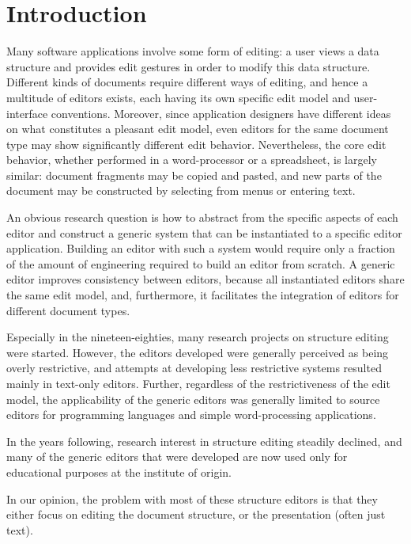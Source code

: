 \documentclass{speauth}
\begin{document}
\section{Introduction} 
\label{chap:introduction}

Many software applications involve some form of editing: a user views a data structure and provides edit gestures in order to modify this data structure. Different kinds of documents require different ways of editing, and hence a multitude of editors exists, each having its own specific edit model and user-interface conventions. Moreover,  since application designers have different ideas on what constitutes a pleasant edit model, even editors for the same document type may show significantly different edit behavior. Nevertheless, the core edit behavior, whether performed in a word-processor or a spreadsheet, is largely similar: document fragments may be copied and pasted, and new parts of the document may be constructed by selecting from menus or entering text. 

An obvious research question is how to abstract from the specific aspects of each editor and construct a generic system that can be instantiated to a specific editor application. Building an editor with such a system would require only a fraction of the amount of engineering required to build an editor from scratch. 
A generic editor improves consistency between editors, because all instantiated editors share the same edit model, and, furthermore, it facilitates the integration of editors for different document types.

Especially in the nineteen-eighties, many research projects on structure editing were started. However, the editors developed were generally perceived as being overly restrictive, and attempts at developing less restrictive systems resulted mainly in text-only editors. Further, regardless of the restrictiveness of the edit model, the applicability of the generic editors was generally limited to source editors for programming languages and simple word-processing applications.

In the years following, research interest in structure editing steadily declined, and many of the generic editors that were developed are now used only for educational purposes at the institute of origin.

In our opinion, the problem with most of these structure editors is that they either focus on editing the document structure, or the presentation (often just text).
\end{document}
